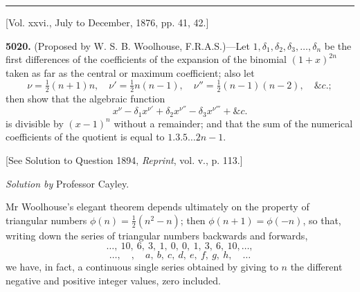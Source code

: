 \documentclass[10pt,twoside]{article}
\begin{document}
\begin{center}
\rule{0.32\linewidth}{0.4pt}

[Vol. xxvi., July to December, 1876, pp. 41, 42.]
\end{center}

\noindent\textbf{5020.} (Proposed by W. S. B. Woolhouse, F.R.A.S.)---Let
\(1,\delta_1,\delta_2,\delta_3,\ldots,\delta_n\) be the first differences of
the coefficients of the expansion of the binomial \((1+x)^{2n}\) taken as far
as the central or maximum coefficient; also let
\[
 \nu=\tfrac12(n+1)n,\quad \nu'=\tfrac12 n(n-1),\quad
 \nu''=\tfrac12(n-1)(n-2),\quad \&c.;
\]
then show that the algebraic function
\[
        x^\nu-\delta_1x^{\nu'}+\delta_2x^{\nu''}-\delta_3x^{\nu'''}+\&c.
\]
is divisible by \((x-1)^n\) without a remainder; and that the sum of the
numerical coefficients of the quotient is equal to \(1.3.5\ldots 2n-1\).

[See Solution to Question 1894, \textit{Reprint}, vol. v., p. 113.]

\newpage

\begin{center}
\textit{Solution by} Professor Cayley.
\end{center}

Mr Woolhouse's elegant theorem depends ultimately on the property of triangular
numbers \(\phi(n)=\frac12(n^2-n)\); then \(\phi(n+1)=\phi(-n)\), so that,
writing down the series of triangular numbers backwards and forwards,
\[
\ldots,\ 10,\ 6,\ 3,\ 1,\ 0,\ 0,\ 1,\ 3,\ 6,\ 10,\ldots,
\]
\[
\ldots,\quad,\quad a,\ b,\ c,\ d,\ e,\ f,\ g,\ h,\quad \ldots
\]
we have, in fact, a continuous single series obtained by giving to \(n\) the
different negative and positive integer values, zero included.
\end{document}
